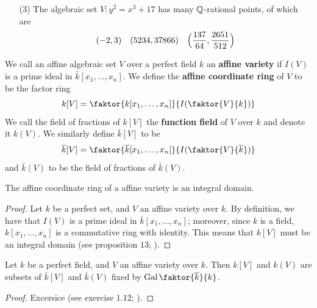 \begin{example}
\begin{enumerate}
         \item[(3)] The algebraic set $V:y^2=x^3+17$ has many $\mathbb{Q}$-rational
             points, of which are
             \begin{align*}
                 (-2,3) &&  (5234,37866)    &&
                 \Big{(} \frac{137}{64},\frac{2651}{512} \Big{)}
             \end{align*}
    \end{enumerate}
\end{example}

\begin{definition}
    We call an affine algebraic set $V$ over a perfect field $k$ an \textbf{affine
    variety} if $I(V)$ is a prime ideal in $\bar{k}[x_1, \dots, x_n]$. We define
    the \textbf{affine coordinate ring} of $V$ to be the factor ring
    \begin{equation*}
        k[V]=\faktor{k[x_1, \dots,x_n]}{I(\faktor{V}{k})}
    \end{equation*}
We call the field of fractions of $k[V]$ the \textbf{function field} of $V$ over
 $k$ and denote it  $k(V)$. We similarly define $\bar{k}[V]$ to be
    \begin{equation*}
        \bar{k}[V]=\faktor{\bar{k}[x_1, \dots,x_n]}{I(\faktor{V}{\bar{k}})}
    \end{equation*}
    and $\bar{k}(V)$ to be the field of fractions of $\bar{k}(V)$.
\end{definition}

\begin{lemma}\label{1.1.4}
    The affine coordinate ring of a affine variety is an integral domain.
\end{lemma}
\begin{proof}
    Let $k$ be a perfect set, and  $V$ an affine variety over  $k$. By
    definition, we have that  $I(V)$ is a prime ideal in $\bar{k}[x_1,
    \dots,x_n]$; moreover, since $k$ is a field,  $k[x_1, \dots, x_n]$ is a
    commutative ring with identity. This means that $k[V]$ must be an integral
    domain (see proposition $13$; \cite{dummit-foote}).
\end{proof}

\begin{lemma}\label{1.1.5}
    Let $k$ be a perfect field, and $V$ an affine variety over $k$. Then  $k[V]$
    and $k(V)$ are subsets of $\bar{k}[V]$ and $\bar{k}(V)$ fixed by
    $\Gal{\faktor{\bar{k}}{k}}$.
\end{lemma}
\begin{proof}
    Excersice (see exercise $1.12$; \cite {silverman}).
\end{proof}

